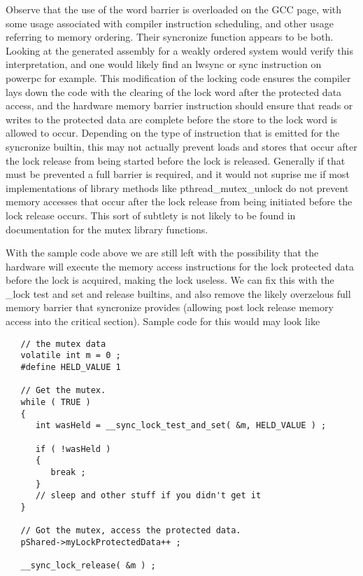 Observe that the use of the word barrier is overloaded on the GCC page, with some usage associated with compiler instruction scheduling, and other usage referring to memory ordering.  Their syncronize function appears to be both.  Looking at the generated assembly for a weakly ordered system would verify this interpretation, and one would likely find an lwsync or sync instruction on powerpc for example.  This modification of the locking code ensures the compiler lays down the code with the clearing of the lock word after the protected data access, and the hardware memory barrier instruction should ensure that reads or writes to the protected data are complete before the store to the lock word is allowed to occur.  Depending on the type of instruction that is emitted for the syncronize builtin, this may not actually prevent loads and stores that occur after the lock release from being started before the lock is released.  Generally if that must be prevented a full barrier is required, and it would not suprise me if most implementations of library methods like pthread\_mutex\_unlock do not prevent memory accesses that occur after the lock release from being initiated before the lock release occurs.  This sort of subtlety is not likely to be found in documentation for the mutex library functions.

With the sample code above we are still left with the possibility that the hardware will execute the memory access instructions for the lock protected data before the lock is acquired, making the lock useless.  We can fix this with the \_lock test and set and release builtins, and also remove the likely overzelous full memory barrier that syncronize provides (allowing post lock release memory access into the critical section).  Sample code for this would may look like

\begin{lstlisting}
   // the mutex data
   volatile int m = 0 ;
   #define HELD_VALUE 1

   // Get the mutex.
   while ( TRUE )
   {
      int wasHeld = __sync_lock_test_and_set( &m, HELD_VALUE ) ;

      if ( !wasHeld )
      {
         break ;
      }
      // sleep and other stuff if you didn't get it
   }

   // Got the mutex, access the protected data.
   pShared->myLockProtectedData++ ;

   __sync_lock_release( &m ) ; 
\end{lstlisting} 

